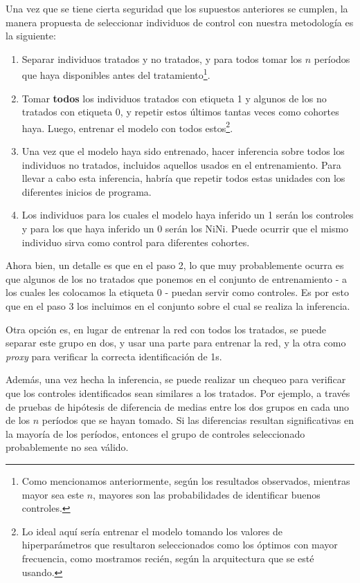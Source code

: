 \documentclass[../main.tex]{subfiles}
\begin{document}
Una vez que se tiene cierta seguridad que los supuestos anteriores se cumplen, la manera
propuesta de seleccionar individuos de control con nuestra metodología es la siguiente:
\begin{enumerate}[itemsep=0.1cm, label=\textbf{\arabic*.}]
    \item Separar individuos tratados y no tratados, y para todos tomar los \(n\) períodos
    que haya disponibles antes del tratamiento\footnote{Como mencionamos anteriormente,
    según los resultados observados, mientras mayor sea este \(n\), mayores son las
    probabilidades de identificar buenos controles.}.
    \item Tomar \textbf{todos} los individuos tratados con etiqueta 1 y algunos de los no
    tratados con etiqueta 0, y repetir estos últimos tantas veces como cohortes haya.
    Luego, entrenar el modelo con todos estos\footnote{Lo ideal aquí sería entrenar el
    modelo tomando los valores de hiperparámetros que resultaron seleccionados como los
    óptimos con mayor frecuencia, como mostramos recién, según la arquitectura que se esté
    usando.}.
    \item Una vez que el modelo haya sido entrenado, hacer inferencia sobre todos los
    individuos no tratados, incluidos aquellos usados en el entrenamiento. Para llevar a
    cabo esta inferencia, habría que repetir todos estas unidades con los diferentes
    inicios de programa.
    \item Los individuos para los cuales el modelo haya inferido un 1 serán los controles
    y para los que haya inferido un 0 serán los NiNi. Puede ocurrir que el mismo individuo
    sirva como control para diferentes cohortes.
\end{enumerate}

Ahora bien, un detalle es que en el paso 2, lo que muy probablemente ocurra es que algunos
de los no tratados que ponemos en el conjunto de entrenamiento - a los cuales les
colocamos la etiqueta 0 - puedan servir como controles. Es por esto que en el paso 3
los incluimos en el conjunto sobre el cual se realiza la inferencia.

Otra opción es, en lugar de entrenar la red con todos los tratados, se puede separar
este grupo en dos, y usar una parte para entrenar la red, y la otra como \textit{proxy}
para verificar la correcta identificación de 1s.

Además, una vez hecha la inferencia, se puede realizar un chequeo para verificar que los
controles identificados sean similares a los tratados. Por ejemplo, a través de pruebas de
hipótesis de diferencia de medias entre los dos grupos en cada uno de los \(n\) períodos
que se hayan tomado. Si las diferencias resultan significativas en la mayoría de los
períodos, entonces el grupo de controles seleccionado probablemente no sea válido.
\end{document}
